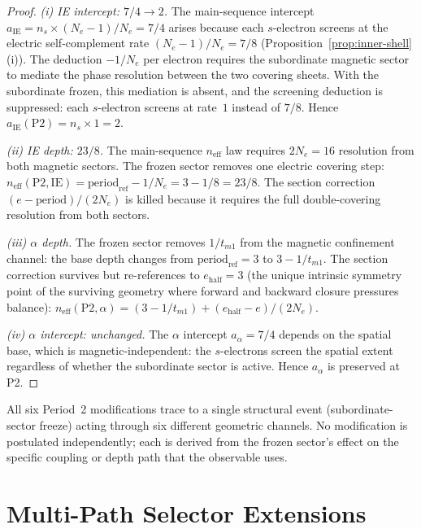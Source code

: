 \documentclass[11pt,a4paper]{article}
\begin{document}
\begin{proof}
\emph{(i) IE intercept: $7/4 \to 2$.} The main-sequence intercept $a_{\mathrm{IE}} = n_s \times (N_e - 1)/N_e = 7/4$ arises because each $s$-electron screens at the electric self-complement rate $(N_e - 1)/N_e = 7/8$ (Proposition~\ref{prop:inner-shell}(i)). The deduction $-1/N_e$ per electron requires the subordinate magnetic sector to mediate the phase resolution between the two covering sheets. With the subordinate frozen, this mediation is absent, and the screening deduction is suppressed: each $s$-electron screens at rate~$1$ instead of $7/8$. Hence $a_{\mathrm{IE}}(\mathrm{P2}) = n_s \times 1 = 2$.

\emph{(ii) IE depth: $23/8$.} The main-sequence $n_{\mathrm{eff}}$ law requires $2N_e = 16$ resolution from both magnetic sectors. The frozen sector removes one electric covering step: $n_{\mathrm{eff}}(\mathrm{P2, IE}) = \mathrm{period}_{\mathrm{ref}} - 1/N_e = 3 - 1/8 = 23/8$. The section correction $(e - \mathrm{period})/(2N_e)$ is killed because it requires the full double-covering resolution from both sectors.

\emph{(iii) $\alpha$ depth.} The frozen sector removes $1/t_{m1}$ from the magnetic confinement channel: the base depth changes from $\mathrm{period}_{\mathrm{ref}} = 3$ to $3 - 1/t_{m1}$. The section correction survives but re-references to $e_{\mathrm{half}} = 3$ (the unique intrinsic symmetry point of the surviving geometry where forward and backward closure pressures balance): $n_{\mathrm{eff}}(\mathrm{P2}, \alpha) = (3 - 1/t_{m1}) + (e_{\mathrm{half}} - e)/(2N_e)$.

\emph{(iv) $\alpha$ intercept: unchanged.} The $\alpha$ intercept $a_\alpha = 7/4$ depends on the spatial base, which is magnetic-independent: the $s$-electrons screen the spatial extent regardless of whether the subordinate sector is active. Hence $a_\alpha$ is preserved at P2.
\end{proof}

All six Period~2 modifications trace to a single structural event (subordinate-sector freeze) acting through six different geometric channels. No modification is postulated independently; each is derived from the frozen sector's effect on the specific coupling or depth path that the observable uses.

\section{Multi-Path Selector Extensions}
\label{sec:stage3}
\end{document}
